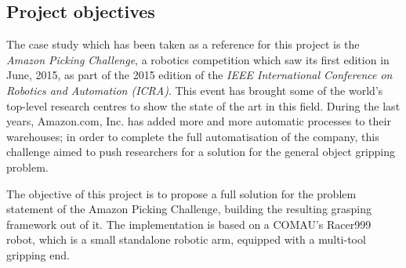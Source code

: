 \documentclass[a4paper,11pt]{article}
\begin{document}
\subsection*{Project objectives}
The case study which has been taken as a reference for this project is
the \emph{Amazon Picking Challenge}, a robotics competition which saw
its first edition in June, 2015, as part of the 2015 edition of the \emph{IEEE
International Conference on Robotics and Automation (ICRA)}. This
event has brought some of the world's top-level research 
centres to show the state of the art in this field. During the last
years, Amazon.com, Inc. has
added more and more automatic processes to their warehouses; in order
to complete the full automatisation of the company, this challenge
aimed to push researchers for a solution for the general object gripping
problem.

The objective of this project is to propose a full solution for the
problem statement of the Amazon Picking Challenge, building the
resulting grasping framework out of it. The implementation is based on a
COMAU's Racer999 robot, which is a small standalone robotic arm,
equipped with a multi-tool gripping end.
\end{document}
